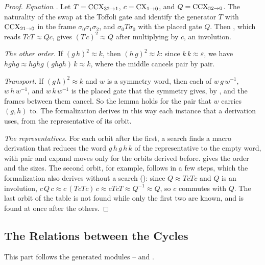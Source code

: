 \documentclass[acmsmall,screen,nonacm]{acmart}
\begin{document}
\begin{proof}
\emph{Equation .} Let $T=\mathrm{CCX}_{32\to1}$, $c=\mathrm{CX}_{1\to0}$, and $Q=\mathrm{CCX}_{32\to0}$. The naturality of the swap at the Toffoli gate and  identify the generator $T$ with $\mathrm{CCX}_{21\to0}$ in the frame $\sigma_0\sigma_1\sigma_2$, and $\sigma_0T\sigma_0$ with the placed gate $Q$. Then , which reads $TcT\approx Qc$, gives $(T\,c)^2\approx Q$ after multiplying by $c$, an involution.

\emph{The other order.} If $(g\,h)^2\approx k$, then $(h\,g)^2\approx k$: since $k\,k\approx\varepsilon$, we have $hghg\approx hghg\,(ghgh)\,k\approx k$, where the middle cancels pair by pair.

\emph{Transport.} If $(g\,h)^2\approx k$ and $w$ is a symmetry word, then each of $w\,g\,w^{-1}$, $w\,h\,w^{-1}$, and $w\,k\,w^{-1}$ is the placed gate that the symmetry gives, by , and the frames between them cancel. So the lemma holds for the pair that $w$ carries $(g,h)$ to. The formalization derives in this way each instance that a derivation uses, from the representative of its orbit.

\emph{The representatives.} For each orbit after the first, a search finds a macro derivation that reduces the word $g\,h\,g\,h\,k$ of the representative to the empty word, with pair and expand moves only for the orbits derived before.  gives the order and the sizes. The second orbit, for example, follows in a few steps, which the formalization also derives without a search \textup{()}: since $Q\approx TcTc$ and $Q$ is an involution, $c\,Q\,c\approx c\,(TcTc)\,c\approx cTcT\approx Q^{-1}\approx Q$, so $c$ commutes with $Q$. The last orbit of the table is not found while only the first two are known, and is found at once after the others.
\end{proof}

\subsection{The Relations between the Cycles}\label{app:xcxccx-relations}

This part follows the generated modules -- and .
\end{document}
